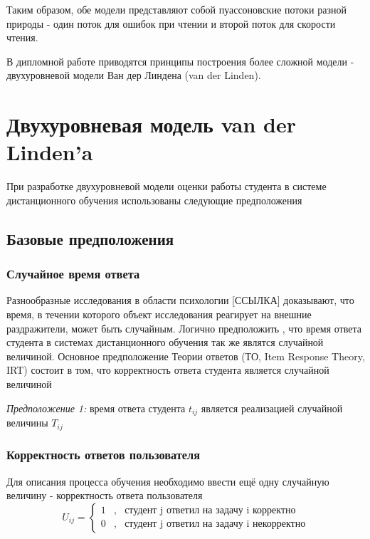 Таким образом, обе модели представляют собой пуассоновские потоки разной природы - один поток для ошибок при чтении и второй поток для скорости чтения.

В дипломной работе приводятся принципы построения более сложной модели - \\двухуровневой модели Ван дер Линдена (van der Linden).

\section{Двухуровневая модель van der Linden'a}

При разработке двухуровневой модели оценки работы студента в системе \\дистанционного обучения использованы следующие предположения

\subsection{Базовые предположения}

\subsubsection{Случайное время ответа}

Разнообразные исследования в области психологии [ССЫЛКА] доказывают, что время, в течении которого объект исследования реагирует на внешние раздражители, может быть случайным. Логично предположить , что время ответа студента в системах дистанционного обучения так же являтся случайной величиной. Основное предположение Теории ответов (ТО, Item Response Theory, IRT) состоит в том, что корректность ответа студента является случайной величиной

{\itshape Предположение 1:} время ответа студента $t_{ij}$ является реализацией случайной величины $T_{ij}$

\subsubsection{Корректность ответов пользователя}

Для описания процесса обучения необходимо ввести ещё одну случайную величину - корректность ответа пользователя
$$
U_{ij} = 
\left\{
\begin{array}{ccl}
1 &,& \mbox{студент j ответил на задачу i корректно}\\
0 &,& \mbox{студент j ответил на задачу i некорректно}
\end{array}
\right.
$$

